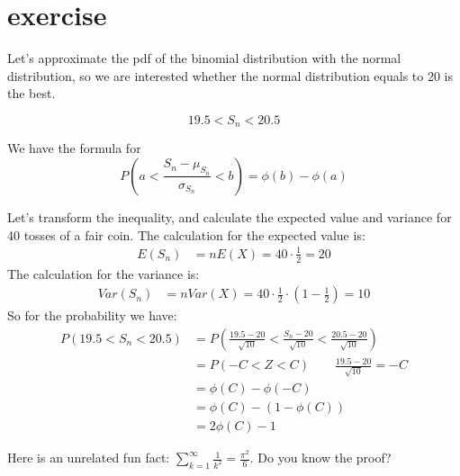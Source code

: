 \documentclass{article}
\begin{document}
\section{exercise}
Let's approximate the pdf of the binomial distribution with the normal distribution,
so we are interested whether the normal distribution equals to 20 is the best.

\[19.5 < {S_n} < 20.5\]

We have the formula for
\[P\left( {a < \frac{{{S_n} - {\mu _{{S_n}}}}}{{{\sigma _{{S_n}}}}} < b} \right) = \phi \left( b \right) - \phi \left( a \right)\]

Let's transform the inequality,
and calculate the expected value and variance for 40 tosses of a fair coin.
The calculation for the expected value is:
\[
    \begin{aligned}
        E\left( {S_n} \right) & = nE\left( X \right) = 40 \cdot \frac{1}{2} = 20
    \end{aligned}
\]
The calculation for the variance is:
\[
    \begin{aligned}
        Var\left( {S_n} \right) & = nVar\left( X \right) = 40 \cdot \frac{1}{2} \cdot \left( 1 - \frac{1}{2} \right) = 10
    \end{aligned}
\]
So for the probability we have:
\[
    \begin{aligned}
        P\left( {19.5 < {S_n} < 20.5} \right) & = P\left( {\frac{{19.5 - 20}}{{\sqrt {10} }} < \frac{{{S_n} - 20}}{{\sqrt {10} }} < \frac{{20.5 - 20}}{{\sqrt {10} }}} \right) \\
                                              & = P\left( { - C < Z< C} \right)  \qquad \frac{{19.5 - 20}}{{\sqrt {10} }} = - C                                                \\
                                              & = \phi (C) - \phi (-C)                                                                                                         \\
                                              & = \phi (C) - (1 - \phi (C))                                                                                                    \\
                                              & = 2\phi (C) - 1
    \end{aligned}
\]

Here is an unrelated fun fact: $\sum_{k=1}^\infty \frac{1}{k^2} = \frac{\pi^2}{6}$.
Do you know the proof?
\end{document}
